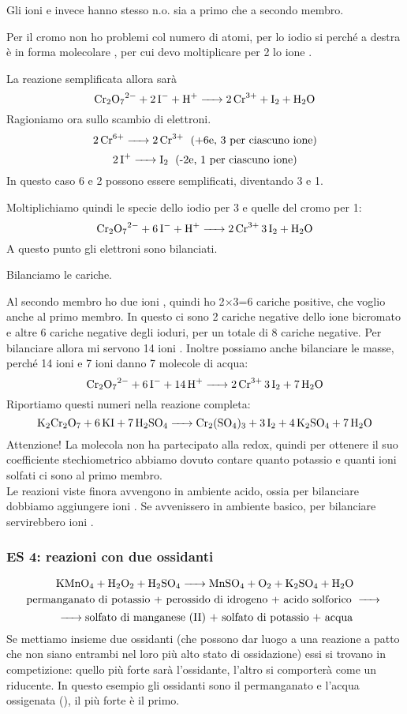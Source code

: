Gli ioni  e  invece hanno stesso n.o. sia a primo che a secondo membro.

Per il cromo non ho problemi col numero di atomi, per lo iodio si perché a destra è in forma molecolare , per cui devo moltiplicare per 2 lo ione .

La reazione semplificata allora sarà
$$\ce{Cr_2O_7^2- + 2I^- + H+ -> 2Cr^3+ + I_2 + H_2O}$$
Ragioniamo ora sullo scambio di elettroni.
$$\ce{2Cr^6+ -> 2Cr^3+ \; \text{(+6e, 3 per ciascuno ione)}}$$
$$\ce{2I+ -> I_2 \; \text{(-2e, 1 per ciascuno ione)}}$$
In questo caso 6 e 2 possono essere semplificati, diventando 3 e 1.

Moltiplichiamo quindi le specie dello iodio per 3 e quelle del cromo per 1:
$$\ce{Cr_2O_7^2- + 6I^- + H+ -> 2Cr^3+ 3I_2 + H_2O}$$
A questo punto gli elettroni sono bilanciati.

Bilanciamo le cariche.

Al secondo membro ho due ioni , quindi ho 2$\times$3=6 cariche positive, che voglio anche al primo membro. In questo ci sono 2 cariche negative dello ione bicromato e altre 6 cariche negative degli ioduri, per un totale di 8 cariche negative. Per bilanciare allora mi servono 14 ioni . Inoltre possiamo anche bilanciare le masse, perché 14 ioni  e 7 ioni  danno 7 molecole di acqua:
$$\ce{Cr_2O_7^2- + 6I^- + 14H+ -> 2Cr^3+ 3I_2 + 7H_2O}$$
Riportiamo questi numeri nella reazione completa:
$$\ce{K_2Cr_2O_7 + 6KI + 7H_2SO_4 -> Cr_2(SO_4)_3 + 3I_2 + 4K_2SO_4 + 7H_2O}$$
Attenzione! La molecola  non ha partecipato alla redox, quindi per ottenere il suo coefficiente stechiometrico abbiamo dovuto contare quanto potassio e quanti ioni solfati ci sono al primo membro.\\

Le reazioni viste finora avvengono in ambiente acido, ossia per bilanciare dobbiamo aggiungere ioni . Se avvenissero in ambiente basico, per bilanciare servirebbero ioni .\\
\subsubsection{\textbf{ES 4: reazioni con due ossidanti}}
$$\ce{KMnO_4 + H_2O_2 + H_2SO_4 -> MnSO_4 + O_2 + K_2SO_4 + H_2O}$$
$$\text{permanganato di potassio + perossido di idrogeno + acido solforico }\ce{->}$$
$$\ce{->}\text{solfato di manganese (II) + solfato di potassio + acqua}$$
Se mettiamo insieme due ossidanti (che possono dar luogo a una reazione a patto che non siano entrambi nel loro più alto stato di ossidazione) essi si trovano in competizione: quello più forte sarà l'ossidante, l'altro si comporterà come un riducente. In questo esempio gli ossidanti sono il permanganato e l'acqua ossigenata (), il più forte è il primo.

